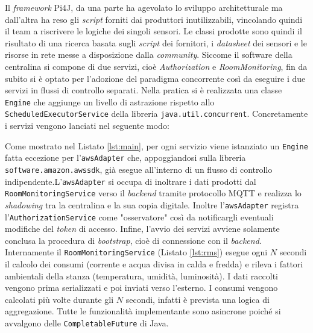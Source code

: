 Il \textit{framework} Pi4J, da una parte ha agevolato lo sviluppo architetturale ma dall'altra ha reso gli \textit{script} forniti dai produttori inutilizzabili, vincolando quindi il team a riscrivere le logiche dei singoli sensori. Le classi prodotte sono quindi il risultato di una ricerca basata sugli \textit{script} dei fornitori, i \textit{datasheet} dei sensori e le risorse in rete messe a disposizione dalla \textit{community}.
\newline\newline
Siccome il software della centralina si compone di due servizi, cioè \textit{Authorization} e \textit{RoomMonitoring}, fin da subito si è optato per l'adozione del paradigma concorrente così da eseguire i due servizi in flussi di controllo separati. Nella pratica si è realizzata una classe \texttt{Engine} che aggiunge un livello di astrazione rispetto allo \texttt{ScheduledExecutorService} della libreria \texttt{java.util.concurrent}. Concretamente i servizi vengono lanciati nel seguente modo:

%
Come mostrato nel Listato \ref{lst:main}, per ogni servizio viene istanziato un \texttt{Engine} fatta eccezione per l'\texttt{awsAdapter} che, appoggiandosi sulla libreria \texttt{software.amazon.awssdk}, già esegue all'interno di un flusso di controllo indipendente.L'\texttt{awsAdapter} si occupa di inoltrare i dati prodotti dal \texttt{RoomMonitoringService} verso il \textit{backend} tramite protocollo MQTT e realizza lo \textit{shadowing} tra la centralina e la sua copia digitale. 
Inoltre l'\texttt{awsAdapter} registra l'\texttt{AuthorizationService} come "osservatore" così da notificargli eventuali modifiche del \textit{token} di accesso. Infine, l'avvio dei servizi avviene solamente conclusa la procedura di \textit{bootstrap}, cioè di connessione con il \textit{backend}.
\newline\newline
Internamente il \texttt{RoomMonitoringService} (Listato \ref*{lst:rms}) esegue ogni $N$ secondi il calcolo dei consumi (corrente e acqua divisa in calda e fredda) e rileva i fattori ambientali della stanza (temperatura, umidità, luminosità). I dati raccolti vengono prima serializzati e poi inviati verso l'esterno. I consumi vengono calcolati più volte durante gli $N$ secondi, infatti è prevista una logica di aggregazione. Tutte le funzionalità implementante sono asincrone poiché si avvalgono delle \texttt{CompletableFuture} di Java.

